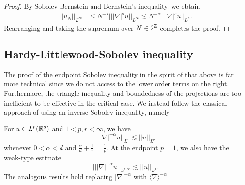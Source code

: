 \begin{proof}
	By Sobolev-Bernstein and Bernstein's inequality, we obtain 
		\begin{align*}
			||u_N||_{L^\infty}
				&\leq N^{-s} || |\nabla|^s u||_{L^\infty} \lesssim N^{-\alpha} |||\nabla|^s u||_{L^p}.
		\end{align*}
	Rearranging and taking the supremum over $N \in 2^\mathbb Z$ completes the proof. 
\end{proof}

\subsection{Hardy-Littlewood-Sobolev inequality}

The proof of the endpoint Sobolev inequality in the spirit of that above is far more technical since we do not access to the lower order terms on the right. Furthermore, the triangle inequality and boundedness of the projections are too inefficient to be effective in the critical case. We instead follow the classical approach of \cite{Hedberg} using an inverse Sobolev inequality, namely

\begin{lemma}
	For $u \in L^p (\mathbb R^d)$ and $1 < p, r < \infty$, we have
		\[ || |\nabla|^{-\alpha} u||_{L^r} \lesssim ||u||_{L^p} \]
	whenever $0 < \alpha < d$ and $\frac{\alpha}{d} + \tfrac1r = \tfrac1p$. At the endpoint $p = 1$, we also have the weak-type estimate
		\[ || |\nabla|^{-\alpha} u||_{L^{r, \infty}} \lesssim ||u||_{L^1}. \]
	The analogous results hold replacing $|\nabla|^{-\alpha}$ with $\langle \nabla \rangle^{-\alpha}$. 
\end{lemma}


